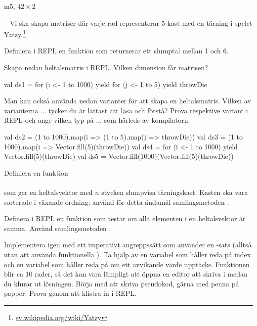 \SubtaskSolved  m5, $42 \times 2$

\QUESTEND






\QUESTBEGIN

\Task  \what~  Vi ska skapa matriser där varje rad representerar 5 kast med en tärning i spelet Yatzy.\footnote{\href{https://sv.wikipedia.org/wiki/Yatzy}{sv.wikipedia.org/wiki/Yatzy}}


\Subtask Definiera i REPL en funktion  som returnerar ett slumptal mellan 1 och 6.


\Subtask Skapa nedan heltalsmatris i REPL. Vilken dimension får matrisen?
\begin{REPL}
val ds1 = for (i <- 1 to 1000) yield {
            for (j <- 1 to 5) yield throwDie
          }
\end{REPL}

\Subtask Man kan också använda nedan varianter för att skapa en heltalsmatris. Vilken av varianterna  ...  tycker du är lättast att läsa och förstå? Prova respektive variant i REPL och ange vilken typ på  ...  som härleds av kompilatorn.
\begin{REPL}
val ds2 = (1 to 1000).map(i => (1 to 5).map(j => throwDie))
val ds3 = (1 to 1000).map(i => Vector.fill(5)(throwDie))
val ds4 = for (i <- 1 to 1000) yield Vector.fill(5)(throwDie)
val ds5 = Vector.fill(1000)(Vector.fill(5)(throwDie))
\end{REPL}


\Subtask Definiera en funktion \\ \\ som ger en heltalsvektor med $n$ stycken slumpvisa tärningskast. Kasten ska vara sorterade i växande ordning; använd för detta ändamål samlingsmetoden .



\Subtask Definera i REPL en funktion  som testar om alla elementen i en heltalsvektor är samma. Använd samlingsmetoden .


\Subtask Implementera  igen med ett imperativt angreppssätt som använder en -sats (alltså utan att använda funktionella  ). Ta hjälp av en variabel  som håller reda på index och en variabel  som håller reda på om ett avvikande värde upptäcks. Funktionen blir ca 10 rader, så det kan vara lämpligt att öppna en editor att skriva i medan du klurar ut lösningen. Börja med att skriva pseudokod, gärna med penna på papper. Prova genom att klistra in i REPL.



